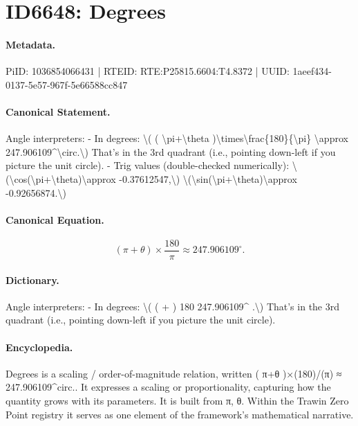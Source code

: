 \section*{ID6648: Degrees}
\paragraph{Metadata.}
PiID: 1036854066431 | RTEID: RTE:P25815.6604:T4.8372 | UUID: 1aeef434-0137-5e57-967f-5e66588cc847

\paragraph{Canonical Statement.}
Angle interpreters: - In degrees: \textbackslash{}( ( \textbackslash{}pi+\textbackslash{}theta )\textbackslash{}times\textbackslash{}frac\{180\}\{\textbackslash{}pi\} \textbackslash{}approx 247.906109\textasciicircum{}\textbackslash{}circ.\textbackslash{}) That’s in the 3rd quadrant (i.e., pointing down-left if you picture the unit circle). - Trig values (double-checked numerically): \textbackslash{}(\textbackslash{}cos(\textbackslash{}pi+\textbackslash{}theta)\textbackslash{}approx -0.37612547,\textbackslash{}) \textbackslash{}(\textbackslash{}sin(\textbackslash{}pi+\textbackslash{}theta)\textbackslash{}approx -0.92656874.\textbackslash{})

\paragraph{Canonical Equation.}
\[
( \pi+\theta )\times\frac{180}{\pi} \approx 247.906109^\circ.
\]

\paragraph{Dictionary.}
Angle interpreters: - In degrees: \textbackslash{}( ( + ) 180 247.906109\textasciicircum{} .\textbackslash{}) That’s in the 3rd quadrant (i.e., pointing down-left if you picture the unit circle).

\paragraph{Encyclopedia.}
Degrees is a scaling / order-of-magnitude relation, written ( π+θ )×(180)/(π) ≈ 247.906109\textasciicircum{}circ.. It expresses a scaling or proportionality, capturing how the quantity grows with its parameters. It is built from π, θ. Within the Trawin Zero Point registry it serves as one element of the framework's mathematical narrative.
